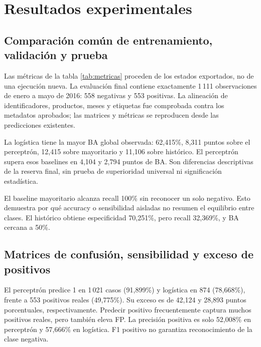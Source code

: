 \barrerapagina
\section{Resultados experimentales}\label{sec:resultados}
\subsection{Comparación común de entrenamiento, validación y prueba}
Las métricas de la tabla \ref{tab:metricas} proceden de los estados exportados, no de una ejecución nueva. La evaluación final contiene exactamente 1\,111 observaciones de enero a mayo de 2016: 558 negativas y 553 positivas. La alineación de identificadores, productos, meses y etiquetas fue comprobada contra los metadatos aprobados; las matrices y métricas se reproducen desde las predicciones existentes.

La logística tiene la mayor BA global observada: 62,415\%, 8,311 puntos sobre el perceptrón, 12,415 sobre mayoritario y 11,106 sobre histórico. El perceptrón supera esos baselines en 4,104 y 2,794 puntos de BA. Son diferencias descriptivas de la reserva final, sin prueba de superioridad universal ni significación estadística.

El baseline mayoritario alcanza recall 100\% sin reconocer un solo negativo. Esto demuestra por qué accuracy o sensibilidad aisladas no resumen el equilibrio entre clases. El histórico obtiene especificidad 70,251\%, pero recall 32,369\%, y BA cercana a 50\%.

\subsection{Matrices de confusión, sensibilidad y exceso de positivos}

El perceptrón predice 1 en 1\,021 casos (91,899\%) y logística en 874 (78,668\%), frente a 553 positivos reales (49,775\%). Su exceso es de 42,124 y 28,893 puntos porcentuales, respectivamente. Predecir positivo frecuentemente captura muchos positivos reales, pero también eleva FP. La precisión positiva es solo 52,008\% en perceptrón y 57,666\% en logística. F1 positivo no garantiza reconocimiento de la clase negativa.

